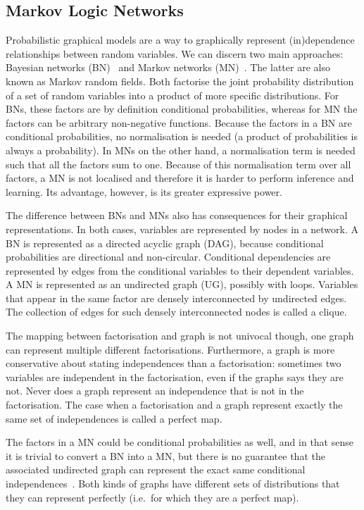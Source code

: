 \documentclass[letterpaper]{article} %
\begin{document}
\subsection{Markov Logic Networks}

Probabilistic graphical models are a way to graphically represent (in)dependence relationships between random variables. We can discern two main approaches: Bayesian networks (BN)~\cite[chapter 10]{murphy2012mlapp} and Markov networks (MN)~\cite[chapter 19]{murphy2012mlapp}. The latter are also known as Markov random fields. Both factorise the joint probability distribution of a set of random variables into a product of more specific distributions. For BNs, these factors are by definition conditional probabilities, whereas for MN the factors can be arbitrary non-negative functions. Because the factors in a BN are conditional probabilities, no normalisation is needed (a product of probabilities is always a probability). In MNs on the other hand, a normalisation term is needed such that all the factors sum to one. Because of this normalisation term over all factors, a MN is not localised and therefore it is harder to perform inference and learning. Its advantage, however, is its greater expressive power.

The difference between BNs and MNs also has consequences for their graphical representations. In both cases, variables are represented by nodes in a network. A BN is represented as a directed acyclic graph (DAG), because conditional probabilities are directional and non-circular. Conditional dependencies are represented by edges from the conditional variables to their dependent variables. A MN is represented as an undirected graph (UG), possibly with loops. Variables that appear in the same factor are densely interconnected by undirected edges. The collection of edges for such densely interconnected nodes is called a clique.

The mapping between factorisation and graph is not univocal though, one graph can represent multiple different factorisations. Furthermore, a graph is more conservative about stating independences than a factorisation: sometimes two variables are independent in the factorisation, even if the graphs says they are not. Never does a graph represent an independence that is not in the factorisation. The case when a factorisation and a graph represent exactly the same set of independences is called a perfect map.

The factors in a MN could be conditional probabilities as well, and in that sense it is trivial to convert a BN into a MN, but there is no guarantee that the associated undirected graph can represent the exact same conditional independences~\cite[chapter 19]{murphy2012mlapp}. Both kinds of graphs have different sets of distributions that they can represent perfectly (i.e.\ for which they are a perfect map).
\end{document}
